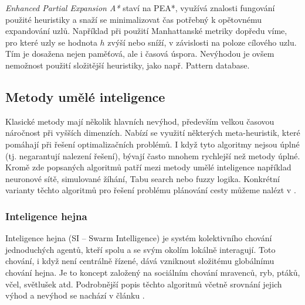 \emph{Enhanced Partial Expansion A*} staví na PEA*, využívá znalosti fungování použité heuristiky a snaží se minimalizovat čas potřebný k opětovnému expandování uzlů. Například při použití Manhattanské metriky dopředu víme, pro které uzly se hodnota $h$ zvýší nebo sníží, v závislosti na poloze cílového uzlu. Tím je dosažena nejen paměťová, ale i časová úspora. Nevýhodou je ovšem nemožnost použití složitější heuristiky, jako např. Pattern database.

 

\subsection{Metody umělé inteligence}
Klasické metody mají několik hlavních nevýhod, především velkou časovou náročnost při vyšších dimenzích. Nabízí se využití některých meta-heuristik, které pomáhají při řešení optimalizačních problémů. I když tyto algoritmy nejsou úplné (tj. negarantují nalezení řešení), bývají často mnohem rychlejší než metody úplné. Kromě zde popsaných algoritmů patří mezi metody umělé inteligence například neuronové sítě, simulované žíhání, Tabu search nebo fuzzy logika. Konkrétní varianty těchto algoritmů pro řešení problému plánování cesty můžeme nalézt v \cite{Masehian2007}.


\subsubsection{Inteligence hejna}
Inteligence hejna (SI -- Swarm Intelligence) je systém kolektivního chování jednoduchých agentů, kteří spolu a se svým okolím lokálně interagují. Toto chování, i když není centrálně řízené, dává vzniknout složitému globálnímu chování hejna. Je to koncept založený na sociálním chování mravenců, ryb, ptáků, včel, světlušek atd. Podrobnější popis těchto algoritmů včetně srovnání jejich výhod a nevýhod se nachází v článku \cite{SinghPal20131218}.

